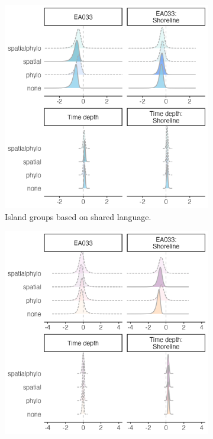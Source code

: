 \documentclass[unnumsec,webpdf,modern,medium]{oup-authoring-template}
\begin{document}
\begin{figure}
\centering
\begin{subfigure}{0.48\textwidth}
  \centering
\includegraphics[width=1\textwidth]{brms_medium_ridge_panels_plot_time_pol_complex.png}
\caption{Island groups based on shared language.}
\label{medium_ridge_panels_plot_time_pol_complex}
\end{subfigure}%
\hfill
\begin{subfigure}{0.48\textwidth}
  \centering
\includegraphics[width=1\textwidth]{brms_SBZR_ridge_panels_plot_time_pol_complex.png}

\end{subfigure}
\end{figure}
\end{document}

